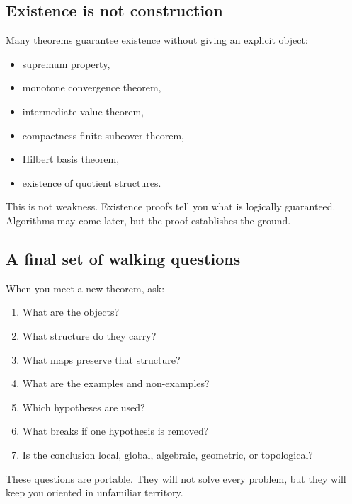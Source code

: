 \subsection{Existence is not construction}

Many theorems guarantee existence without giving an explicit object:

\begin{itemize}
\item supremum property,
\item monotone convergence theorem,
\item intermediate value theorem,
\item compactness finite subcover theorem,
\item Hilbert basis theorem,
\item existence of quotient structures.
\end{itemize}

This is not weakness. Existence proofs tell you what is logically guaranteed.
Algorithms may come later, but the proof establishes the ground.

\subsection{A final set of walking questions}

\begin{walkbox}
When you meet a new theorem, ask:
\begin{enumerate}
\item What are the objects?
\item What structure do they carry?
\item What maps preserve that structure?
\item What are the examples and non-examples?
\item Which hypotheses are used?
\item What breaks if one hypothesis is removed?
\item Is the conclusion local, global, algebraic, geometric, or topological?
\end{enumerate}
\end{walkbox}

These questions are portable. They will not solve every problem, but they will
keep you oriented in unfamiliar territory.
